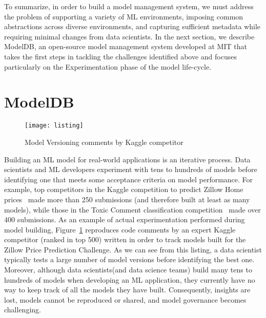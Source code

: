 \documentclass[11pt]{article}
\newcommand{\mdb}{{\sc ModelDB}\xspace}
\newcommand{\Dss}{Data scientists\xspace}
\newcommand{\dss}{data scientists\xspace}
\newcommand{\ds}{data scientist\xspace}
\newcommand{\mldevs}{ML developers\xspace}
\begin{document}
To summarize, in order to build a model management system, we must address the problem of supporting a variety of ML environments, imposing common abstractions across diverse environments, and capturing sufficient metadata while requiring minimal changes from \dss.
In the next section, we describe \mdb, an open-source model management system developed at MIT that takes the first steps in tackling the challenges identified above and focuses particularly on the Experimentation phase of the model life-cycle.

\section{\mdb}
\label{sec:modeldb}

\begin{figure}[tb] 
\centerline{
\texttt{[image: listing]}}
\caption{Model Versioning comments by Kaggle competitor}
\label{lst:versioning_2}
\end{figure}

Building an ML model for real-world applications is an iterative process. 
\Dss and \mldevs experiment with tens to hundreds of models before identifying 
one that meets some acceptance criteria on model performance.
For example, top competitors in the Kaggle competition to predict Zillow Home prices~\cite{zillow} made more than 250 submissions (and therefore built at least as many models), while those in the Toxic Comment classification competition~\cite{toxic-comments} made over 400 submissions.
As an example of actual experimentation performed during model building, Figure~\ref{lst:versioning_2} reproduces code comments by an expert Kaggle competitor (ranked in top 500) written in order to track models built for the Zillow Price Prediction Challenge.
As we can see from this listing, a \ds typically tests a large number of model versions before identifying the best one.
Moreover, although \dss (and data science teams) build many tens to hundreds of models
when developing an ML application, they currently have no way to keep track of all 
the models they have built.
Consequently, insights are lost, models cannot be reproduced or shared, and model governance becomes challenging.
\end{document}
